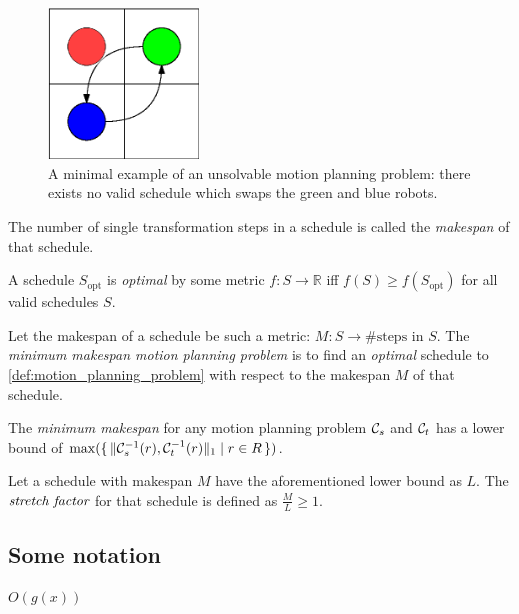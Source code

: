 \begin{figure}[h]
	\centering
	\includegraphics[width=4cm]{include/impossible_2x2.eps}
	\caption{A minimal example of an unsolvable motion planning problem: there exists no valid schedule which swaps the green and blue robots.}\label{fig:reachability}
\end{figure}

\begin{definition}\label{def:makespan}
	The number of single transformation steps in a schedule is called the \emph{makespan} of that schedule.
\end{definition}

\begin{definition}\label{def:optimality}
	A schedule $S_\text{opt}$ is \emph{optimal} by some metric $f : S \rightarrow \mathbb{R}$ iff $f(S) \geq f(S_\text{opt})$ for all valid schedules $S$. 
\end{definition}


\begin{definition}
	Let the makespan of a schedule be such a metric: $M : S \rightarrow \text{\# steps in } S$.
	The \emph{minimum makespan motion planning problem} is to find an \emph{optimal} schedule to \cref{def:motion_planning_problem} with respect to the makespan $M$ of that schedule. 
\end{definition}

\begin{remark}
	The \emph{minimum makespan} for any motion planning problem $\mathcal{C}_{s}$ and $\mathcal{C}_{t}$ has a lower bound of $\max(\set{\lVert\mathcal{C}_{s}^{-1}(r), \mathcal{C}_{t}^{-1}(r)\rVert_1 \mid r \in R})$.
\end{remark}

\begin{definition}
	Let a schedule with makespan $M$ have the aforementioned lower bound as  $L$.
	The $\emph{stretch factor}$ for that schedule is defined as $\frac{M}{L} \geq 1$.
\end{definition}

\subsection{Some notation}

\begin{definition}
	$O(g(x))$
\end{definition}






